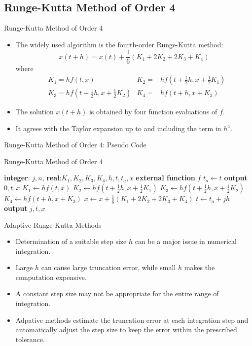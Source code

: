 \documentclass{beamer}
\newcommand{\beforeverb}{\scriptsize}
\newcommand{\afterverb}{\normalsize}
\begin{document}
\subsection[Runge-Kutta Method of Order 4]{Runge-Kutta Method of Order 4}
\begin{frame}{Runge-Kutta Method of Order 4}
\begin{itemize}
\item The widely used algorithm is the fourth-order Runge-Kutta method:
\[
x(t+h)=x(t)+\frac{1}{6}(K_1+2K_2+2K_3+K_4)
\]
where
\begin{align*}
&K_1=hf(t,x)  &K_2=&hf(t+\frac{1}{2}h,x+\frac{1}{2} K_1)\\
&K_3=hf(t+\frac{1}{2}h,x+\frac{1}{2} K_2) &K_4=&hf(t+h,x+ K_3)
\end{align*}
\item The solution $x(t+h)$  is obtained by \alert{four} function evaluations of $f$.
\item It agrees with the Taylor expansion up to and including the term in $h^4$.
\end{itemize}
\end{frame}
\begin{frame}{Runge-Kutta Method of Order 4: Pseudo Code}
\beforeverb
\begin{block}{Runge-Kutta Method of Order 4}
\begin{algorithmic}[1]
\State \textbf{integer}: $j, n$, \textbf{real}:$K_1, K_2, K_3, K_4, h, t, t_a, x$
\State \textbf{external function} $f$
\State $t_a\gets t $
\State \textbf{output} $0,t,x$
\State $K_1 \gets h f(t,x)$
\State $K_2 \gets hf(t+\frac{1}{2}h,x+\frac{1}{2} K_1)$
\State $K_3 \gets hf(t+\frac{1}{2}h,x+\frac{1}{2} K_2)$
\State $K_4 \gets hf(t+h,x+ K_3)$
\State $x\gets x+\frac{1}{6}(K_1+2K_2+2K_3+K_4)$
\State $t\gets t_a+jh$
\State \textbf{output} $j,t,x$
\EndFor
\EndProcedure
\end{algorithmic}
\end{block}
\afterverb

\end{frame}
\begin{frame}{Adaptive Runge-Kutta Methods}
\begin{itemize}
\item Determination of a suitable step size $h$ can be a major issue in numerical integration.
\item Large $h$ can cause large truncation error, while small $h$ makes the computation expensive.
\item A constant step size may not be appropriate for the entire range of integration.
\item \alert{Adpative methods} estimate the truncation error at each integration step and automatically adjust the step size to keep the error within the prescribed \alert{tolerance}.

\end{itemize}
\end{frame}
\end{document}
